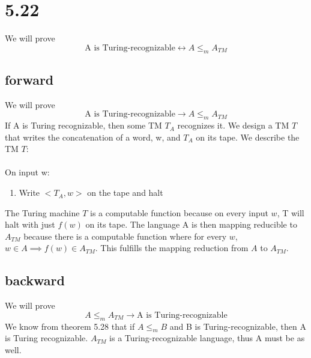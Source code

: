 \documentclass{article}
\begin{document}
\section*{5.22}

We will prove 
$$
\textrm{A is Turing-recognizable} \leftrightarrow A \leq_m A_{TM}
$$

\subsection*{forward}
We will prove
$$\textrm{A is Turing-recognizable} \rightarrow A \leq_m A_{TM}$$
If A is Turing recognizable, then some TM $T_A$ recognizes it. We design a TM $T$ that writes the concatenation of a word, w, and $T_A$ on its tape. We describe the TM $T$:\\\\
On input w:
\begin{enumerate}
    \item Write $<T_A, w>$ on the tape and halt
\end{enumerate}
The Turing machine $T$ is a computable function because on every input $w$, T will halt with just $f(w)$ on its tape. The language A is then mapping reducible to $A_{TM}$ because there is a computable function where for every $w$, $w\in A \implies f(w) \in A_{TM}$. This fulfills the mapping reduction from $A$ to $A_{TM}$.

\subsection*{backward}
We will prove
$$A \leq_m A_{TM} \rightarrow \textrm{A is Turing-recognizable}$$
We know from theorem 5.28 that if $A \leq_m B$ and B is Turing-recognizable, then A is Turing recognizable. $A_{TM}$ is a Turing-recognizable language, thus A must be as well.
\end{document}
